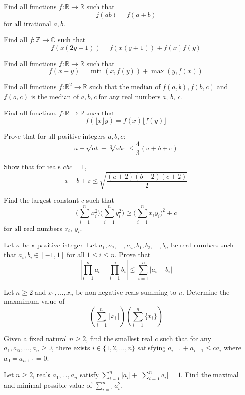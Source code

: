 
 {Find all functions $f: \mathbb{R} \rightarrow \mathbb{R}$ such that
    \[f(ab) = f(a+b)\]
for all irrational $a, b$.}

 {Find all $f:\mathbb{Z} \rightarrow\mathbb{C}$ such that $$f(x(2y+1))=f(x(y+1))+f(x)f(y)$$}



 {Find all functions $f: \mathbb{R}\rightarrow\mathbb{R}$ such that
\[f(x+y) = \min(x, f(y)) + \max(y, f(x))\]}

 {Find all functions $f: \mathbb{R}^2\rightarrow\mathbb{R}$ such that the median of $f(a,b), f(b,c)$ and $f(a,c)$ is the median of $a, b, c$ for any real numbers $a$, $b$, $c$.}

 {Find all functions $f: \mathbb{R}\rightarrow\mathbb{R}$ such that
\[f(\lfloor x \rfloor y) = f(x) \lfloor f(y) \rfloor\]}



 {Prove that for all positive integers $a, b, c$:
\[a + \sqrt{ab} + \sqrt[3]{abc} \le \frac43(a+b+c)\]}

 {Show that for reals $abc = 1$,
\[a + b + c \le \sqrt{\frac{(a+2)(b+2)(c+2)}{2}}\]}



 {Find the largest constant $c$ such that
\[\Big(\sum_{i=1}^nx_i^2\Big)\Big(\sum_{i=1}^ny_i^2\Big)\ge\Big(\sum_{i=1}^nx_iy_i\Big)^2+c\]
for all real numbers $x_i$, $y_i$.}

 {Let $n$ be a positive integer. Let $a_1, a_2, ..., a_n, b_1,b_2,...,b_n$ be real numbers such that $a_i,b_i\in [-1,1]$ for all $1\le i\le n$. Prove that $$\left\lvert \prod_{i=1}^n a_i - \prod_{i=1}^n b_i\right\rvert \le \sum_{i=1}^n |a_i-b_i|$$}

 {Let $n\ge 2$ and $x_1,...,x_n$ be non-negative reals summing to $n$. Determine the maxmimum value of $$\left(\sum_{i=1}^n \lfloor x_i \rfloor \right) \left(\sum_{i=1}^n \{x_i\} \right)$$}

 {Given a fixed natural $n\ge 2$, find the smallest real $c$ such that for any $a_1,a_@,...,a_n\ge 0$, there exists $i\in\{1,2,...,n\}$ satisfying $a_{i-1}+a_{i+1}\le ca_i$ where $a_0=a_{n+1}=0$.}

 {Let $n\ge 2$, reals $a_1,...,a_n$ satisfy $\sum_{i=1}^n |a_i| + \lvert \sum_{i=1}^n a_i\rvert = 1$. Find the maximal and minimal possible value of $\sum_{i=1}^n a_i^2$.}

